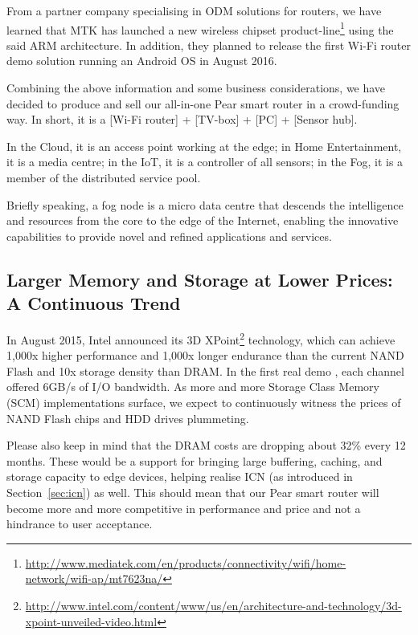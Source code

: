 From a partner company specialising in ODM solutions for routers, we have learned that MTK has launched a new wireless chipset product-line\footnote{\url{http://www.mediatek.com/en/products/connectivity/wifi/home-network/wifi-ap/mt7623na/}} using the said ARM architecture. In addition, they planned to release the first Wi-Fi router demo solution running an Android OS in August 2016. 

Combining the above information and some business considerations, we have decided to produce and sell our all-in-one Pear smart router in a crowd-funding way. In short, it is a [Wi-Fi router] + [TV-box] + [PC] + [Sensor hub].  

In the Cloud, it is an access point working at the edge; in Home Entertainment, it is a media centre; in the IoT, it is a controller of all sensors; in the Fog, it is a member of the distributed service pool. 

Briefly speaking, a fog node is a micro data centre that descends the intelligence and resources from the core to the edge of the Internet, enabling the innovative capabilities to provide novel and refined applications and services.  

\subsection{Larger Memory and Storage at Lower Prices: A Continuous Trend} %

In August 2015, Intel announced its 3D XPoint\footnote{\url{http://www.intel.com/content/www/us/en/architecture-and-technology/3d-xpoint-unveiled-video.html}} technology, which can achieve 1,000x higher performance and 1,000x longer endurance than the current NAND Flash and 10x storage density than DRAM. In the first real demo \cite{intel-3dxpoint-ssd}, each channel offered 6GB/s of I/O bandwidth. As more and more Storage Class Memory (SCM) implementations surface, we expect to continuously witness the prices of NAND Flash chips and HDD drives plummeting. 

Please also keep in mind that the DRAM costs are dropping about 32\% every 12 months. These would be a support for bringing large buffering, caching, and storage capacity to edge devices, helping realise ICN (as introduced in Section~\ref{sec:icn}) as well. This should mean that our Pear smart router will become more and more competitive in performance and price and not a hindrance to user acceptance. 

 
\newpage
